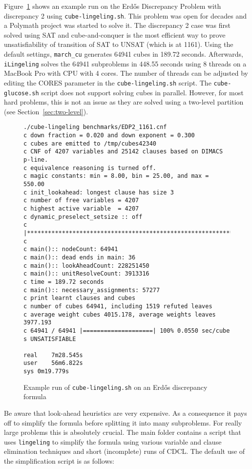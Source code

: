 \documentclass{llncs}
\begin{document}
Figure~\ref{fig:EDP} shows an example run on the Erd\H{o}s Discrepancy Problem with 
discrepancy 2 using {\tt cube-lingeling.sh}. This problem was open for 
decades and a Polymath project was started to solve it. The 
discrepancy 2 case was first solved using SAT and cube-and-conquer
is the most efficient way to prove unsatisfiability of transition of SAT
to UNSAT (which is at 1161). Using the default settings, {\tt march\_cu}
generates 64941 cubes in 189.72 seconds. Afterwards,  {\tt iLingeling}
solves the 64941 subproblems in 448.55 seconds using 8 threads
on a MacBook Pro with CPU with 4 cores. The number of threads can
be adjusted by editing the CORES parameter in the {\tt cube-lingeling.sh} script.
The {\tt cube-glucose.sh} script does not support solving cubes in parallel.
However, for most hard problems, this is not an issue as they are solved 
using a two-level partition (see Section~\ref{sec:two-level}).

\begin{figure}[h]
\centering
\begin{verbatim}
./cube-lingeling benchmarks/EDP2_1161.cnf
c down fraction = 0.020 and down exponent = 0.300
c cubes are emitted to /tmp/cubes42340
c CNF of 4207 variables and 25142 clauses based on DIMACS p-line.
c equivalence reasoning is turned off.
c magic constants: min = 8.00, bin = 25.00, and max = 550.00
c init_lookahead: longest clause has size 3
c number of free variables = 4207
c highest active variable  = 4207
c dynamic_preselect_setsize :: off
c |****************************************************************.|
c
c main():: nodeCount: 64941
c main():: dead ends in main: 36
c main():: lookAheadCount: 228251450
c main():: unitResolveCount: 3913316
c time = 189.72 seconds
c main():: necessary_assignments: 57277
c print learnt clauses and cubes
c number of cubes 64941, including 1519 refuted leaves
c average weight cubes 4015.178, average weights leaves 3977.193
c 64941 / 64941 |====================| 100% 0.0550 sec/cube 
s UNSATISFIABLE

real	7m28.545s
user	56m6.822s
sys	0m19.779s
\end{verbatim}
\caption{Example run of {\tt cube-lingeling.sh} on an Erd\H{o}s discrepancy formula}
\label{fig:EDP}
\end{figure}

Be aware that look-ahead heuristics are very expensive. As a consequence it pays off
to simplify the formula before splitting it into many subproblems. For 
really large problems this is absolutely crucial. The main folder contains
a script that uses {\tt lingeling} to simplify the formula using various 
variable and clause elimination techniques and short (incomplete) runs of CDCL. 
The default use of the simplification script is as follows:
\end{document}
